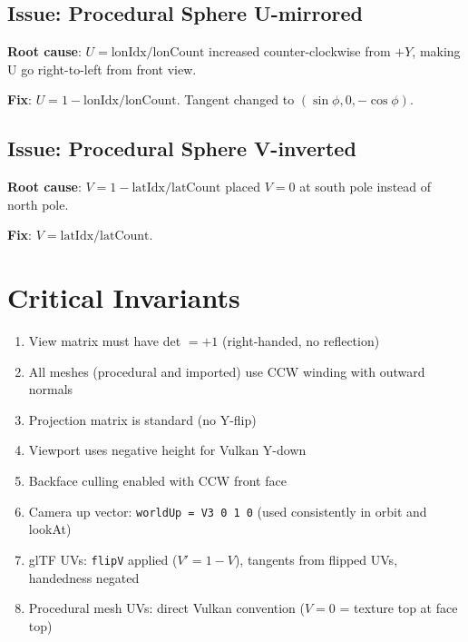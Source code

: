 \documentclass{article}
\begin{document}
\subsection{Issue: Procedural Sphere U-mirrored}
\textbf{Root cause}: $U = \text{lonIdx}/\text{lonCount}$ increased counter-clockwise from $+Y$, making U go right-to-left from front view.

\textbf{Fix}: $U = 1 - \text{lonIdx}/\text{lonCount}$. Tangent changed to $(\sin\phi, 0, -\cos\phi)$.

\subsection{Issue: Procedural Sphere V-inverted}
\textbf{Root cause}: $V = 1 - \text{latIdx}/\text{latCount}$ placed $V=0$ at south pole instead of north pole.

\textbf{Fix}: $V = \text{latIdx}/\text{latCount}$.

\section{Critical Invariants}

\begin{enumerate}
\item View matrix must have det $= +1$ (right-handed, no reflection)
\item All meshes (procedural and imported) use CCW winding with outward normals
\item Projection matrix is standard (no Y-flip)
\item Viewport uses negative height for Vulkan Y-down
\item Backface culling enabled with CCW front face
\item Camera up vector: \texttt{worldUp = V3 0 1 0} (used consistently in orbit and lookAt)
\item glTF UVs: \texttt{flipV} applied ($V' = 1-V$), tangents from flipped UVs, handedness negated
\item Procedural mesh UVs: direct Vulkan convention ($V=0$ = texture top at face top)
\end{enumerate}
\end{document}
